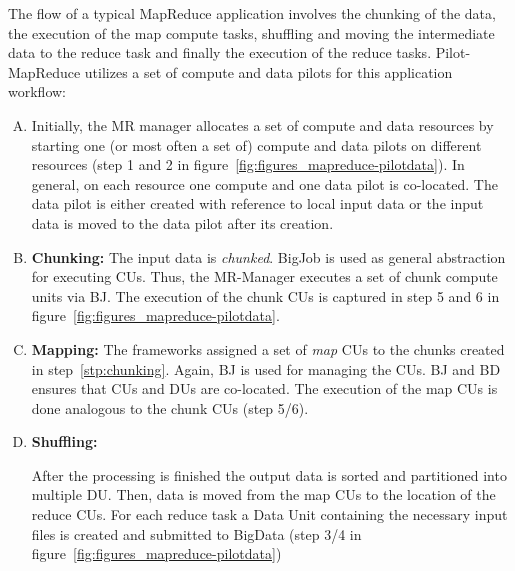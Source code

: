 \documentclass{acm_proc_article-sp}
\newcommand{\jhanote}[1]{ {\textcolor{red} { ***shantenu: #1 }}}
\newcommand{\alnote}[1]{ {\textcolor{blue} { ***andreL: #1 }}}
\newcommand{\pnote}[1]{ {\textcolor{magenta} { ***pradeep: #1 }}}
\newcommand{\alnote}[1]{}
\newcommand{\pnote}[1]{}
\newcommand{\jhanote}[1]{}
\newcommand{\pilotmapreduce}{Pilot-MapReduce\xspace}
\begin{document}
The flow of a typical MapReduce application involves the chunking of
the data, the execution of the map compute tasks, shuffling and moving
the intermediate data to the reduce task and finally the execution of
the reduce tasks.  \pilotmapreduce utilizes a set of compute and data
pilots for this application workflow: %
\begin{enumerate}[A.]
\item Initially, the MR manager allocates a set of compute and data
  resources by starting one (or most often a set of) compute and data
  pilots on different resources (step 1 and 2 in
  figure~\ref{fig:figures_mapreduce-pilotdata}). In general, on each
  resource one compute and one data pilot is co-located. The data
  pilot is either created with reference to local input data or the
  input data is moved to the data pilot after its creation.

\item \textbf{Chunking:} The input data is {\it chunked}. BigJob is
  used as general abstraction for executing CUs. Thus, the MR-Manager
  executes a set of chunk compute units via BJ. The execution of
  the chunk CUs is captured in step 5 and 6 in
  figure~\ref{fig:figures_mapreduce-pilotdata}. \label{stp:chunking}
	
\item \textbf{Mapping:} The frameworks assigned a set of {\it map} CUs
  to the chunks created in step~\ref{stp:chunking}. Again, BJ is used
  for managing the CUs. BJ and BD ensures that CUs and DUs are
  co-located. The execution of the map CUs is done analogous to the
  chunk CUs (step 5/6).
	
\item \textbf{Shuffling:} %

  After the processing is finished the output data is sorted and
  partitioned into multiple DU. Then, data is moved from the map CUs
  to the location of the reduce CUs. For each reduce task a Data Unit
  containing the necessary input files is created and submitted to
  BigData (step 3/4 in figure~\ref{fig:figures_mapreduce-pilotdata})
		

\end{enumerate}
\end{document}
